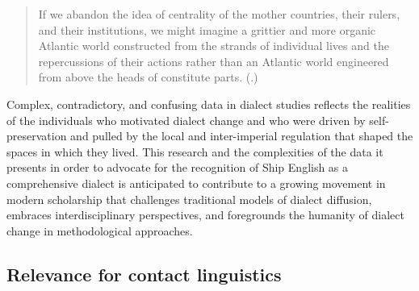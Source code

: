 \begin{quotation}
If we abandon the idea of centrality of the mother countries, their rulers, and their institutions, we might imagine a grittier and more organic Atlantic world constructed from the strands of individual lives and the repercussions of their actions rather than an Atlantic world engineered from above the heads of constitute parts. (\citealt{Daniels2015}.)\end{quotation}

Complex, contradictory, and confusing data in dialect studies reflects the realities of the individuals who motivated dialect change and who were driven by self-preservation and pulled by the local and inter-imperial regulation that shaped the spaces in which they lived. This research and the complexities of the data it presents in order to advocate for the recognition of Ship English as a comprehensive dialect is anticipated to contribute to a growing movement in modern scholarship that challenges traditional models of dialect diffusion, embraces interdisciplinary perspectives, and foregrounds the humanity of dialect change in methodological approaches. 

\subsection{{Relevance} {for} {contact} {linguistics}}%

